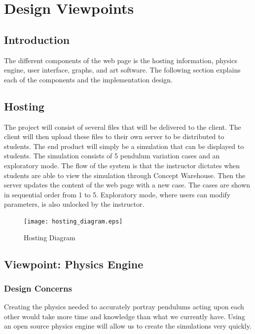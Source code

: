 \documentclass[onecolumn, draftclsnofoot,10pt, compsoc]{IEEEtran}
\begin{document}
\section{Design Viewpoints}

\subsection{Introduction}
The different components of the web page is the hosting information, physics engine, user interface, graphs, and art software. The following section explains each of the components and the implementation design. 
\subsection{Hosting}
The project will consist of several files that will be delivered to the client. The client will then upload these files to their own server to be distributed to students. The end product will simply be a simulation that can be displayed to students.
The simulation consists of 5 pendulum variation cases and an exploratory mode. The flow of the system is that the instructor dictates when students are able to view the simulation through Concept Warehouse. Then the server updates the content of the web page with a new case. The cases are shown in sequential order from 1 to 5. Exploratory mode, where users can modify parameters, is also unlocked by the instructor. 

\begin{figure}[H]
  \texttt{[image: hosting\_diagram.eps]}
  \caption{Hosting Diagram}
  \label{fig:host}
\end{figure}

\subsection{Viewpoint: Physics Engine}

\subsubsection{Design Concerns}
Creating the physics needed to accurately portray pendulums acting upon each other would take more time and knowledge than what we currently have. Using an open source physics engine will allow us to create the simulations very quickly.
\end{document}
